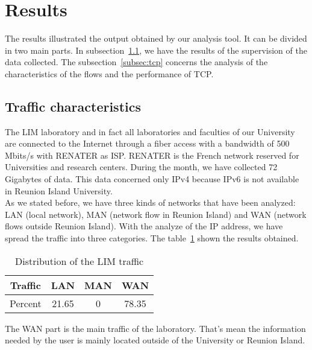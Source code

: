 \documentclass[10pt, conference, a4paper, twocolumns]{IEEEtran}
\def\rouge#1{\textcolor{red}{#1}}
\def\yassine#1{\textbf{\textcolor{blue}{yassine : #1}}}
\begin{document}
\section{Results}
\label{sec:results}
The results illustrated the output obtained by our analysis tool. It can be divided in two main parts. In subsection~\ref{subsec:carac}, we have the results of the supervision of the data collected. The subsection~\ref{subsec:tcp} concerns the analysis of the characteristics of the flows and the performance of TCP.%

\subsection{Traffic characteristics}
\label{subsec:carac}
The LIM laboratory and in fact all laboratories and faculties of our University are connected to the Internet through a fiber access with a bandwidth of 500 Mbits/s with RENATER as ISP. RENATER is the French network reserved for Universities and research centers. During the month, we have collected 72 Gigabytes of data. This data concerned only IPv4 because IPv6 is not available in Reunion Island University.\\
As we stated before, we have three kinds of networks that have been analyzed: LAN (local network), MAN (network flow in Reunion Island) and WAN (network flows outside Reunion Island). With the analyze of the IP address, we have spread the traffic into three categories. The table~\ref{table:lwman} shown the results obtained.
\begin{table}[ht!]
\centering
\caption{Distribution of the LIM traffic}
\label{table:lwman}
\begin{tabular}{|c|c|c|c|}
\hline
Traffic & LAN & MAN & WAN \\ \hline
Percent & 21.65 & 0 & 78.35 \\ \hline
\end{tabular}
\end{table}
The WAN part is the main traffic of the laboratory. That's mean the information needed by the user is mainly located outside of the University or Reunion Island. \\
\end{document}
